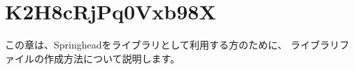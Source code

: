 \newpage
\section{K2H8cRjPq0Vxb98X}
\label{sec:ForNonDevelopper}

\noindent
\KLUDGE この章は、Springhead\KLUDGE をライブラリとして利用する方のために、
\KLUDGE ライブラリファイルの作成方法について説明します。

